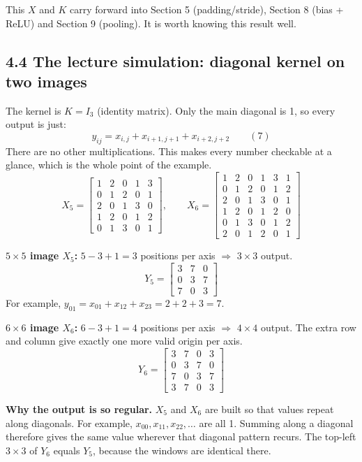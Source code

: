 This $X$ and $K$ carry forward into Section 5 (padding/stride), Section 8 (bias + ReLU) and Section 9 (pooling). It is worth knowing this result well.

\subsection*{4.4 The lecture simulation: diagonal kernel on two images}

The kernel is $K = I_3$ (identity matrix). Only the main diagonal is 1, so every output is just:
\[
y_{ij} = x_{i,j} + x_{i+1,j+1} + x_{i+2,j+2} \qquad (7)
\]
There are no other multiplications. This makes every number checkable at a glance, which is the whole point of the example.
\[
X_5 = \begin{bmatrix}1&2&0&1&3\\0&1&2&0&1\\2&0&1&3&0\\1&2&0&1&2\\0&1&3&0&1\end{bmatrix}, \qquad
X_6 = \begin{bmatrix}1&2&0&1&3&1\\0&1&2&0&1&2\\2&0&1&3&0&1\\1&2&0&1&2&0\\0&1&3&0&1&2\\2&0&1&2&0&1\end{bmatrix}
\]

\textbf{$5\times5$ image $X_5$:} $5-3+1 = 3$ positions per axis $\Rightarrow$ $3\times3$ output.
\[
Y_5 = \begin{bmatrix}3&7&0\\0&3&7\\7&0&3\end{bmatrix}
\]
For example, $y_{01} = x_{01} + x_{12} + x_{23} = 2+2+3 = 7$.

\textbf{$6\times6$ image $X_6$:} $6-3+1 = 4$ positions per axis $\Rightarrow$ $4\times4$ output. The extra row and column give exactly one more valid origin per axis.
\[
Y_6 = \begin{bmatrix}3&7&0&3\\0&3&7&0\\7&0&3&7\\3&7&0&3\end{bmatrix}
\]

\textbf{Why the output is so regular.} $X_5$ and $X_6$ are built so that values repeat along diagonals. For example, $x_{00}, x_{11}, x_{22}, \dots$ are all 1. Summing along a diagonal therefore gives the same value wherever that diagonal pattern recurs. The top-left $3\times3$ of $Y_6$ equals $Y_5$, because the windows are identical there.

